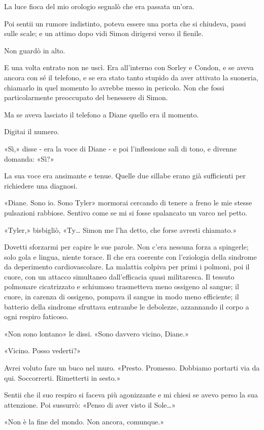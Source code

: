 La luce fioca del mio orologio segnalò che era passata un'ora.

Poi sentii un rumore indistinto, poteva essere una porta che si
chiudeva, passi sulle scale; e un attimo dopo vidi Simon dirigersi verso
il fienile.

Non guardò in alto.

E una volta entrato non ne uscì. Era all'interno con Sorley e Condon, e
se aveva ancora con sé il telefono, e se era stato tanto stupido da aver
attivato la suoneria, chiamarlo in quel momento lo avrebbe messo in
pericolo. Non che fossi particolarmente preoccupato del benessere di
Simon.

Ma se aveva lasciato il telefono a Diane quello era il momento.

Digitai il numero.

«Sì,» disse - era la voce di Diane - e poi l'inflessione salì di tono, e
divenne domanda: «Sì?»

La sua voce era ansimante e tenue. Quelle due sillabe erano già
sufficienti per richiedere una diagnosi.

«Diane. Sono io. Sono Tyler» mormorai cercando di tenere a freno le mie
stesse pulsazioni rabbiose. Sentivo come se mi si fosse spalancato un
varco nel petto.

«Tyler,» bisbigliò, «Ty\ldots{} Simon me l'ha detto, che forse avresti
chiamato.»

Dovetti sforzarmi per capire le sue parole. Non c'era nessuna forza a
spingerle; solo gola e lingua, niente torace. Il che era coerente con
l'eziologia della sindrome da deperimento cardiovascolare. La malattia
colpiva per primi i polmoni, poi il cuore, con un attacco simultaneo
dall'efficacia quasi militaresca. Il tessuto polmonare cicatrizzato e
schiumoso trasmetteva meno ossigeno al sangue; il cuore, in carenza di
ossigeno, pompava il sangue in modo meno efficiente; il batterio della
sindrome sfruttava entrambe le debolezze, azzannando il corpo a ogni
respiro faticoso.

«Non sono lontano» le dissi. «Sono davvero vicino, Diane.»

«Vicino. Posso vederti?»

Avrei voluto fare un buco nel muro. «Presto. Promesso. Dobbiamo portarti
via da qui. Soccorrerti. Rimetterti in sesto.»

Sentii che il suo respiro si faceva più agonizzante e mi chiesi se avevo
perso la sua attenzione. Poi sussurrò: «Penso di aver visto il
Sole\ldots»

«Non è la fine del mondo. Non ancora, comunque.»

